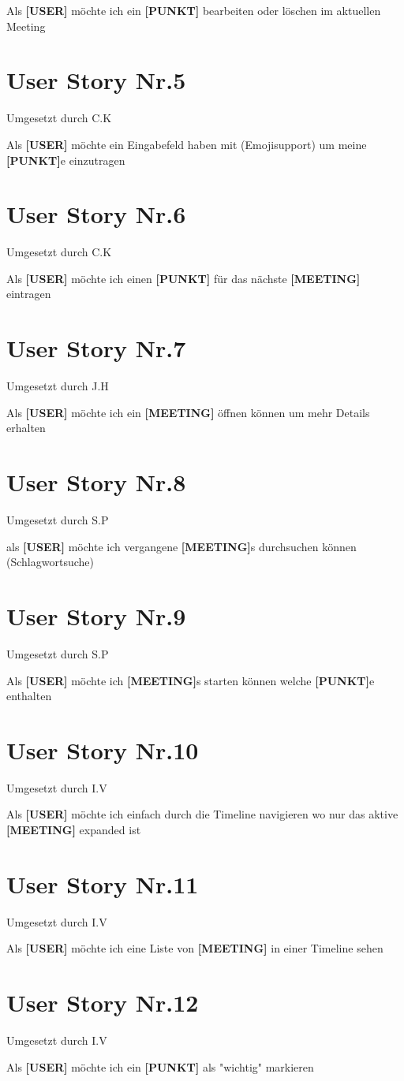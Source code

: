 Als \textbf{[USER]} möchte ich ein \textbf{[PUNKT]} bearbeiten oder löschen im aktuellen Meeting
\section{User Story Nr.5}
{\tiny{Umgesetzt durch C.K}} 

Als \textbf{[USER]} möchte ein Eingabefeld haben mit (Emojisupport) um meine \textbf{[PUNKT]}e einzutragen
\section{User Story Nr.6}
{\tiny{Umgesetzt durch C.K}} 

Als \textbf{[USER]} möchte ich einen \textbf{[PUNKT]} für das nächste \textbf{[MEETING]} eintragen
\section{User Story Nr.7}
{\tiny{Umgesetzt durch J.H}} 

Als \textbf{[USER]} möchte ich ein \textbf{[MEETING]} öffnen können um mehr Details erhalten
\section{User Story Nr.8}
{\tiny{Umgesetzt durch S.P}} 

als \textbf{[USER]} möchte ich vergangene \textbf{[MEETING]}s durchsuchen können (Schlagwortsuche)
\section{User Story Nr.9}
{\tiny{Umgesetzt durch S.P}} 

Als  \textbf{[USER]} möchte ich \textbf{[MEETING]}s starten können welche \textbf{[PUNKT]}e enthalten
\section{User Story Nr.10}
{\tiny{Umgesetzt durch I.V}} 

Als  \textbf{[USER]} möchte ich einfach durch die Timeline navigieren wo nur das aktive \textbf{[MEETING]} expanded ist
\section{User Story Nr.11}
{\tiny{Umgesetzt durch I.V}}

Als \textbf{[USER]} möchte ich eine Liste von \textbf{[MEETING]} in einer Timeline sehen

\section{User Story Nr.12}
{\tiny{Umgesetzt durch I.V}}

Als \textbf{[USER]} möchte ich ein  \textbf{[PUNKT]} als "wichtig" markieren